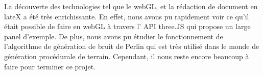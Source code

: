 La découverte des technologies tel que le webGL, et la rédaction de document en lateX a été très enrichissante. En effet, nous avons pu rapidement voir ce qu'il était possible de faire en webGL à travers l' API three.JS qui propose un large panel d'exemple. De plus, nous avons pu étudier le fonctionnement de l'algorithme de génération de bruit de Perlin qui est très utilisé dans le monde de génération procédurale de terrain. Cependant, il nous reste encore beaucoup à faire pour terminer ce projet.

